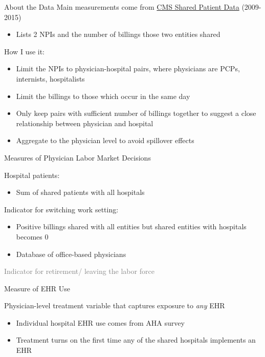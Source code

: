 \documentclass[10pt]{beamer}
\begin{document}
\begin{frame}{About the Data}
    Main measurements come from \underline{CMS Shared Patient Data} (2009-2015)
    \begin{itemize}
        \item Lists 2 NPIs and the number of billings those two entities shared
    \end{itemize}
    \vspace{3mm}
    
    How I use it:
    \begin{itemize}
        \item Limit the NPIs to physician-hospital pairs, where physicians are PCPs, internists, hospitalists
        \item Limit the billings to those which occur in the same day
        \item Only keep pairs with sufficient number of billings together to suggest a close relationship between physician and hospital
        \item Aggregate to the physician level to avoid spillover effects
    \end{itemize}
\end{frame}


\begin{frame}{Measures of Physician Labor Market Decisions}


     Hospital patients: 
    \begin{itemize}
        \item Sum of shared patients with all hospitals
    \end{itemize}
     
     \vspace{4mm}
     
     Indicator for switching work setting:
    \begin{itemize}
        \item Positive billings shared with all entities but shared entities with hospitals becomes 0
        \item Database of office-based physicians
    \end{itemize}
    
    \vspace{4mm}
    
    \textcolor{gray}
     {Indicator for retirement/ leaving the labor force}

\end{frame}

\begin{frame}{Measure of EHR Use}

Physician-level treatment variable that captures exposure to \textit{any} EHR
\vspace{3mm}
\begin{itemize}
    \item Individual hospital EHR use comes from AHA survey
    \vspace{3mm}
    \item Treatment turns on the first time any of the shared hospitals implements an EHR
\end{itemize}
\end{frame}
\end{document}
